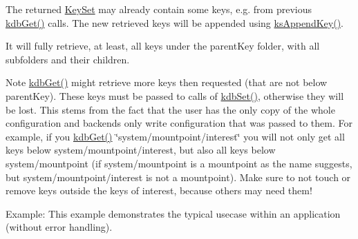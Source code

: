 The {\ttfamily returned} \hyperlink{classkdb_1_1KeySet}{Key\-Set} may already contain some keys, e.\-g. from previous \hyperlink{group__kdb_ga28e385fd9cb7ccfe0b2f1ed2f62453a1}{kdb\-Get()} calls. The new retrieved keys will be appended using \hyperlink{group__keyset_gaa5a1d467a4d71041edce68ea7748ce45}{ks\-Append\-Key()}.

It will fully retrieve, at least, all keys under the {\ttfamily parent\-Key} folder, with all subfolders and their children.

\begin{DoxyNote}{Note}
\hyperlink{group__kdb_ga28e385fd9cb7ccfe0b2f1ed2f62453a1}{kdb\-Get()} might retrieve more keys then requested (that are not below parent\-Key). These keys must be passed to calls of \hyperlink{group__kdb_ga11436b058408f83d303ca5e996832bcf}{kdb\-Set()}, otherwise they will be lost. This stems from the fact that the user has the only copy of the whole configuration and backends only write configuration that was passed to them. For example, if you \hyperlink{group__kdb_ga28e385fd9cb7ccfe0b2f1ed2f62453a1}{kdb\-Get()} \char`\"{}system/mountpoint/interest\char`\"{} you will not only get all keys below system/mountpoint/interest, but also all keys below system/mountpoint (if system/mountpoint is a mountpoint as the name suggests, but system/mountpoint/interest is not a mountpoint). Make sure to not touch or remove keys outside the keys of interest, because others may need them!
\end{DoxyNote}
\begin{DoxyParagraph}{Example\-:}
This example demonstrates the typical usecase within an application (without error handling).
\end{DoxyParagraph}

